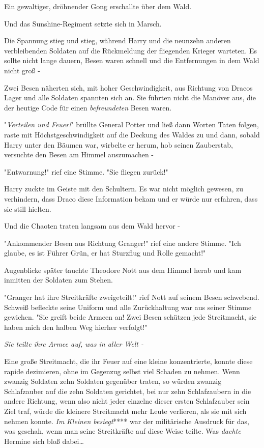 {\later

Ein gewaltiger, dröhnender Gong erschallte über dem Wald.

Und das Sunshine-Regiment setzte sich in Marsch.

\later

Die Spannung stieg und stieg, während Harry und die neunzehn anderen verbleibenden Soldaten auf die Rückmeldung der fliegenden Krieger warteten. Es sollte nicht lange dauern, Besen waren schnell und die Entfernungen in dem Wald nicht groß -

Zwei Besen näherten sich, mit hoher Geschwindigkeit, aus Richtung von Dracos Lager und alle Soldaten spannten sich an. Sie führten nicht die Manöver aus, die der heutige Code für einen \emph{befreundeten} Besen waren.

"\emph{Verteilen und Feuer!}" brüllte General Potter und ließ dann Worten Taten folgen, raste mit Höchstgeschwindigkeit auf die Deckung des Waldes zu und dann, sobald Harry unter den Bäumen war, wirbelte er herum, hob seinen Zauberstab, versuchte den Besen am Himmel auszumachen -

"Entwarnung!" rief eine Stimme. "Sie fliegen zurück!"

Harry zuckte im Geiste mit den Schultern. Es war nicht möglich gewesen, zu verhindern, dass Draco diese Information bekam und er würde nur erfahren, dass sie still hielten.

Und die Chaoten traten langsam aus dem Wald hervor -

"Ankommender Besen aus Richtung Granger!" rief eine andere Stimme. "Ich glaube, es ist Führer Grün, er hat Sturzflug und Rolle gemacht!"

Augenblicke später tauchte Theodore Nott aus dem Himmel herab und kam inmitten der Soldaten zum Stehen.

"Granger hat ihre Streitkräfte zweigeteilt!" rief Nott auf seinem Besen schwebend. Schweiß befleckte seine Uniform und alle Zurückhaltung war aus seiner Stimme gewichen. "Sie greift beide Armeen an! Zwei Besen schützen jede Streitmacht, sie haben mich den halben Weg hierher verfolgt!"

\emph{Sie teilte ihre Armee auf, was in aller Welt -}

Eine große Streitmacht, die ihr Feuer auf eine kleine konzentrierte, konnte diese rapide dezimieren, ohne im Gegenzug selbst viel Schaden zu nehmen. Wenn zwanzig Soldaten zehn Soldaten gegenüber traten, so würden zwanzig Schlafzauber auf die zehn Soldaten gerichtet, bei nur zehn Schlafzaubern in die andere Richtung, wenn also nicht jeder einzelne dieser ersten Schlafzauber sein Ziel traf, würde die kleinere Streitmacht mehr Leute verlieren, als sie mit sich nehmen konnte. \emph{Im} \emph{Kleinen besiegt}**** war der militärische Ausdruck für das, was geschah, wenn man seine Streitkräfte auf diese Weise teilte. Was \emph{dachte} Hermine sich bloß dabei…

}
